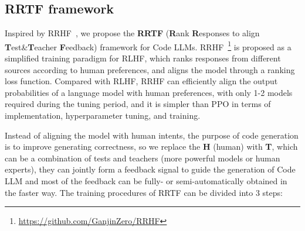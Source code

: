 \documentclass{article}
\begin{document}
\subsection{RRTF framework}

Inspired by RRHF~\cite{rrhf}, we propose the \textbf{RRTF} (\textbf{R}ank \textbf{R}esponses to align \textbf{T}est\&\textbf{T}eacher \textbf{F}eedback) framework for Code LLMs. RRHF~\footnote{\url{https://github.com/GanjinZero/RRHF}} is proposed as a simplified training paradigm for RLHF, which ranks responses from different sources according to human preferences, and aligns the model through a ranking loss function.
Compared with RLHF, RRHF can efficiently align the output probabilities of a language model with human preferences, with only 1-2 models required during the tuning period, and it is simpler than PPO in terms of implementation, hyperparameter tuning, and training.

Instead of aligning the model with human intents, the purpose of code generation is to improve generating correctness, so we replace the \textbf{H} (human) with \textbf{T}, which can be a combination of tests and teachers (more powerful models or human experts), they can jointly form a feedback signal to guide the generation of Code LLM and most of the feedback can be fully- or semi-automatically obtained in the faster way.
The training procedures of RRTF can be divided into 3 steps:
\end{document}
